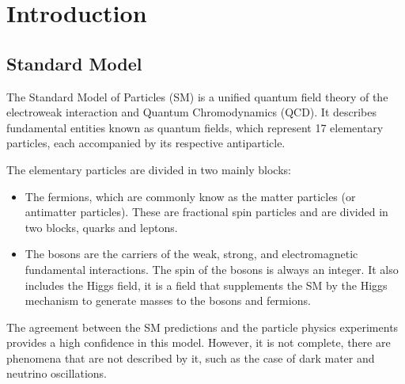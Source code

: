 \chapter{Introduction}
\minitoc
\label{Cap:Int}
% 
\section{Standard Model}
\label{Cap:Int:SM}
The Standard Model of Particles (SM) is a unified quantum field theory of the electroweak interaction and Quantum Chromodynamics (QCD). It describes fundamental entities known as quantum fields, which represent 17 elementary particles, each accompanied by its respective antiparticle.

The elementary particles are divided in two mainly blocks: 
\begin{itemize}
    \item The fermions, which are commonly know as the matter particles (or antimatter particles). These are fractional spin particles and are divided in two blocks, quarks and leptons. 
    \item The bosons are the carriers of the weak, strong, and electromagnetic fundamental interactions. The spin of the bosons is always an integer. It also includes the Higgs field, it is a field that supplements the SM by the Higgs mechanism to generate masses to the bosons and fermions.
\end{itemize}

The agreement between the SM predictions and the particle physics experiments provides a high confidence in this model. However, it is not complete, there are phenomena that are not described by it, such as the case of dark mater and neutrino oscillations.

